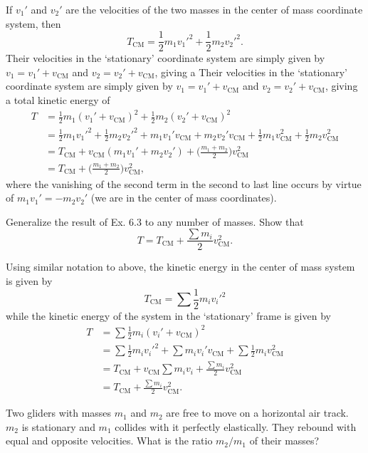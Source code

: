 \documentclass[../feynman-lectures-on-physics.tex]{subfiles}
\begin{document}
\begin{questions}
	\begin{solution}
		If $v_1'$ and $v_2'$ are the velocities of the two masses in the center of
		mass coordinate system, then
		\[
			T_{\text{CM}} = \frac{1}{2}m_1v_1'^2 + \frac{1}{2}m_2v_2'^2.
		\]
		Their velocities in the `stationary' coordinate system are simply given by
		$v_1 = v_1' + v_{\text{CM}}$ and $v_2 = v_2' + v_{\text{CM}}$, giving a
		Their velocities in the `stationary' coordinate system are simply given by
		$v_1 = v_1' + v_{\text{CM}}$ and $v_2 = v_2' + v_{\text{CM}}$, giving a total
		kinetic energy of
		\begin{align*}
			T &= \frac{1}{2}m_1(v_1'+v_{\text{CM}})^2 + \frac{1}{2}m_2(v_2'+v_{\text{CM}})^2 \\
			  &= \frac{1}{2}m_1v_1'^2 + \frac{1}{2}m_2v_2'^2 + m_1v_1'v_{\text{CM}} + m_2v_2'v_{\text{CM}} + \frac{1}{2}m_1v_{\text{CM}}^2 + \frac{1}{2}m_2v_{\text{CM}}^2 \\
			  &= T_{\text{CM}} + v_{\text{CM}}(m_1v_1' + m_2v_2') + \Big(\frac{m_1+m_2}{2}\Big)v_{\text{CM}}^2 \\
			  &= T_{\text{CM}} + \Big(\frac{m_1+m_2}{2}\Big)v_{\text{CM}}^2,
		\end{align*}
		where the vanishing of the second term in the second to last line occurs by
		virtue of $m_1v_1' = -m_2v_2'$ (we are in the center of mass coordinates).
	\end{solution}

	\question Generalize the result of Ex. 6.3 to any number of masses. Show that
	\[
		T = T_{\text{CM}} + \frac{\sum m_i}{2}v_{\text{CM}}^2.
	\]

	\begin{solution}
		Using similar notation to above, the kinetic energy in the center of mass
		system is given by
		\[
			T_{\text{CM}} = \sum\frac{1}{2}m_iv_i'^2
		\]
		while the kinetic energy of the system in the `stationary' frame is given by
		\begin{align*}
			T &= \sum\frac{1}{2}m_i(v_i' + v_{\text{CM}})^2 \\
			  &= \sum\frac{1}{2}m_iv_i'^2 + \sum m_iv_i'v_{\text{CM}} + \sum\frac{1}{2}m_iv_{\text{CM}}^2 \\
			  &= T_{\text{CM}} + v_{\text{CM}}\sum m_iv_i + \frac{\sum m_i}{2}v_{\text{CM}}^2 \\
			  &= T_{\text{CM}} + \frac{\sum m_i}{2}v_{\text{CM}}^2.
		\end{align*}
	\end{solution}

	\question Two gliders with masses $m_1$ and $m_2$ are free to move on a
	horizontal air track. $m_2$ is stationary and $m_1$ collides with it perfectly
	elastically. They rebound with equal and opposite velocities. What is the
	ratio $m_2/m_1$ of their masses?


\end{questions}
\end{document}
